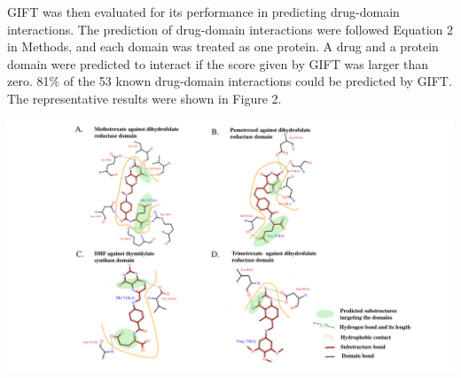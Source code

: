 \documentclass[a0,portrait]{a0poster}
\begin{document}
\begin{multicols}{2}
GIFT was then evaluated for its performance in predicting drug-domain interactions. The prediction of drug-domain interactions were followed Equation 2 in Methods, and each domain was treated as one protein. A drug and a protein domain were predicted to interact if the score given by GIFT was larger than zero.
81\% of the 53 known drug-domain interactions could be predicted by GIFT. The representative results were shown in Figure 2.

\begin{center}\vspace{1cm}
  \includegraphics[width=\linewidth]{ligplot_5}
\end{center}\vspace{1cm}



\end{multicols}
\end{document}
